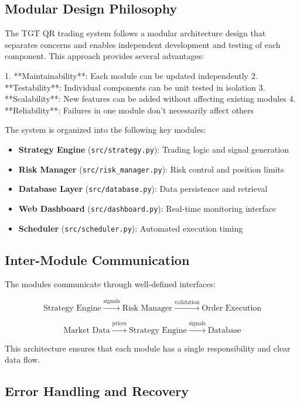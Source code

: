 \documentclass[12pt,a4paper]{article}
\begin{document}
\subsection{Modular Design Philosophy}

The TGT QR trading system follows a modular architecture design that separates concerns and enables independent development and testing of each component. This approach provides several advantages:

1. **Maintainability**: Each module can be updated independently
2. **Testability**: Individual components can be unit tested in isolation
3. **Scalability**: New features can be added without affecting existing modules
4. **Reliability**: Failures in one module don't necessarily affect others

The system is organized into the following key modules:

\begin{itemize}
\item \textbf{Strategy Engine} (\texttt{src/strategy.py}): Trading logic and signal generation
\item \textbf{Risk Manager} (\texttt{src/risk\_manager.py}): Risk control and position limits
\item \textbf{Database Layer} (\texttt{src/database.py}): Data persistence and retrieval
\item \textbf{Web Dashboard} (\texttt{src/dashboard.py}): Real-time monitoring interface
\item \textbf{Scheduler} (\texttt{src/scheduler.py}): Automated execution timing
\end{itemize}

\subsection{Inter-Module Communication}

The modules communicate through well-defined interfaces:

\[
\text{Strategy Engine} \xrightarrow{\text{signals}} \text{Risk Manager} \xrightarrow{\text{validation}} \text{Order Execution}
\]

\[
\text{Market Data} \xrightarrow{\text{prices}} \text{Strategy Engine} \xrightarrow{\text{signals}} \text{Database}
\]

This architecture ensures that each module has a single responsibility and clear data flow.

\subsection{Error Handling and Recovery}
\end{document}
